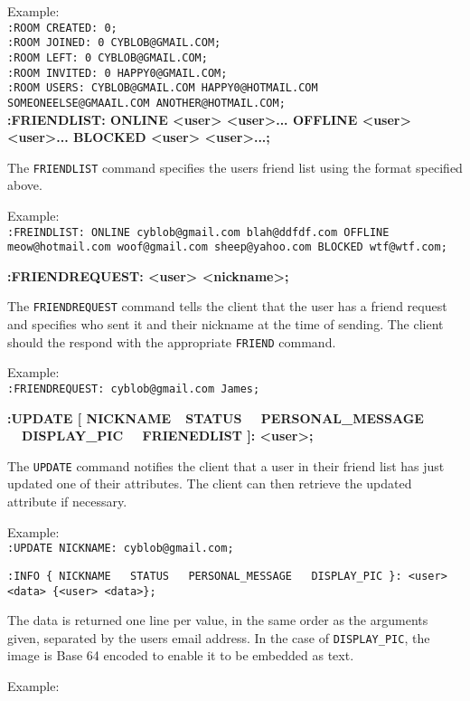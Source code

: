 Example: \\
\texttt{:ROOM CREATED: 0;} \\
\texttt{:ROOM JOINED: 0 CYBLOB@GMAIL.COM;} \\
\texttt{:ROOM LEFT: 0 CYBLOB@GMAIL.COM;} \\
\texttt{:ROOM INVITED: 0 HAPPY0@GMAIL.COM;} \\
\texttt{:ROOM USERS: CYBLOB@GMAIL.COM HAPPY0@HOTMAIL.COM \\SOMEONEELSE@GMAAIL.COM ANOTHER@HOTMAIL.COM;} \\

{\bf :FRIENDLIST: ONLINE <user> <user>... OFFLINE <user> <user>... BLOCKED <user> <user>...;}

The \texttt{FRIENDLIST} command specifies the users friend list using the format specified above.

Example: \\
\texttt{:FREINDLIST: ONLINE cyblob@gmail.com blah@ddfdf.com OFFLINE meow@hotmail.com woof@gmail.com sheep@yahoo.com BLOCKED wtf@wtf.com;}

{\bf :FRIENDREQUEST: <user> <nickname>;}

The \texttt{FRIENDREQUEST} command tells the client that the user has a friend request and specifies who sent it and their nickname at the time of sending. The client should the respond with the appropriate \texttt{FRIEND} command.

Example: \\
\texttt{:FRIENDREQUEST: cyblob@gmail.com James;}

{\bf :UPDATE [ NICKNAME\ \vline \ STATUS \ \vline \ PERSONAL\_MESSAGE \ \vline \ DISPLAY\_PIC \ \vline \ FRIENEDLIST  ]: <user>;}

The \texttt{UPDATE} command notifies the client that a user in their friend list has just updated one of their attributes. The client can then retrieve the updated attribute if necessary.

Example: \\
\texttt{:UPDATE NICKNAME: cyblob@gmail.com;}

\texttt{:INFO \{ NICKNAME \ \vline \ STATUS \ \vline \ PERSONAL\_MESSAGE \ \vline \ DISPLAY\_PIC \}: <user> <data> \{<user> <data>\};} 

The data is returned one line per value, in the same order as the arguments given, separated by the users email address. In the case of \texttt{DISPLAY\_PIC}, the image is Base 64 encoded to enable it to be embedded as text.

Example: \\

